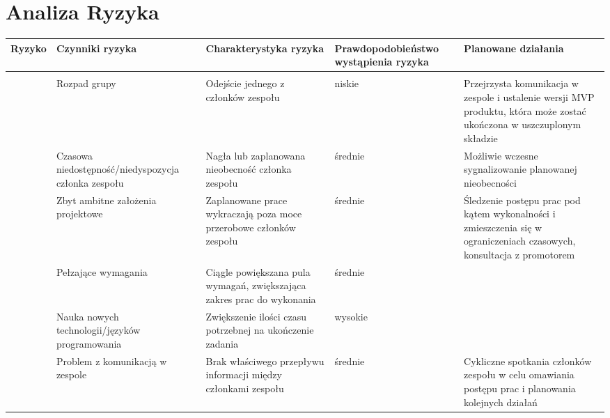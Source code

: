 

\section{Analiza Ryzyka}
\label{subsec:analiza-ryzyka}

\begin{longtable}{|p{}|p{}|p{}|p{}|p{}|}

    \hline
    Ryzyko & Czynniki ryzyka & Charakterystyka ryzyka & Prawdopodobieństwo wystąpienia ryzyka & Planowane działania \\
    \hline
    \multirow{7}{*}{\parbox[t]{2mm}{}} & & & & \\
    \cline{2-5}
     & Rozpad grupy & Odejście jednego z członków zespołu & niskie 
    & Przejrzysta komunikacja w zespole i ustalenie wersji MVP produktu, która może zostać ukończona w uszczuplonym składzie \\
    \hline
     & Czasowa niedostępność/niedyspozycja członka zespołu & Nagła lub zaplanowana nieobecność członka zespołu & średnie 
     & Możliwie wczesne sygnalizowanie planowanej nieobecności \\
    \hline
     & Zbyt ambitne założenia projektowe & Zaplanowane prace wykraczają poza moce przerobowe członków zespołu & średnie
    & Śledzenie postępu prac pod kątem wykonalności i zmieszczenia się w ograniczeniach czasowych, konsultacja z promotorem \\
    \hline
     & Pełzające wymagania & Ciągle powiększana pula wymagań, zwiększająca zakres prac do wykonania & średnie & \\
    \hline
     & Nauka nowych technologii/języków programowania & Zwiększenie ilości czasu potrzebnej na ukończenie zadania & 
     wysokie & \\
    \hline
     & Problem z komunikacją w zespole & Brak właściwego przepływu informacji między członkami zespołu & średnie
     & Cykliczne spotkania członków zespołu w celu omawiania postępu prac i planowania kolejnych działań \\
    \hline

\end{longtable}
